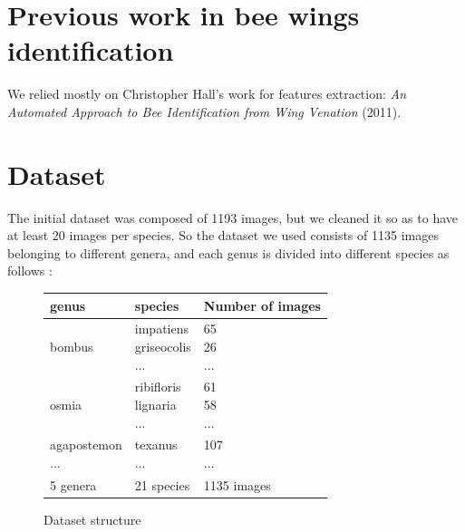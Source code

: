 \documentclass[a4paper]{article}
\begin{document}
\section{Previous work in bee wings identification}
\label{sec:theory}

We relied mostly on Christopher Hall's work for features extraction: \textit{An Automated Approach to Bee Identification from Wing Venation} (2011).

\section{Dataset}
The initial dataset was composed of 1193 images, but we cleaned it so as to have at least 20 images per species.
So the dataset we used consists of 1135 images belonging to different genera, and each genus is divided into different species as follows :

\begin{figure}[h]
    \begin{tabular}{ |m{2cm}|m{10em}|m{10em}| }
 \hline
genus & species & Number of images \\
\hline
bombus& \makecell{impatiens \\ griseocolis \\ ...}& \makecell{65  \\ 26 \\...}\\
\hline
osmia & \makecell{ribifloris \\ lignaria \\ ...}  & \makecell{61\\ 58\\ ...}\\
\hline
\makecell{agapostemon \\ ... }& \makecell{texanus \\ ...}& \makecell{107  \\... }\\
\hline
5 genera & 21 species & 1135 images\\
\hline
\end{tabular}
\caption{Dataset structure}
\end{figure}
\end{document}
